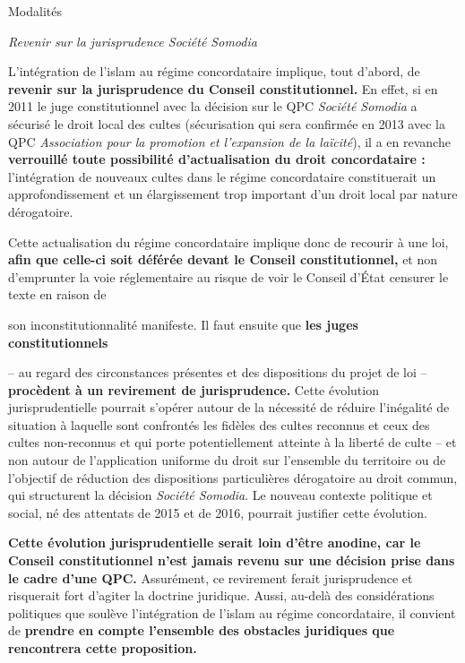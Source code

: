 Modalités


\emph{Revenir sur la jurisprudence Société Somodia}

L'intégration de l'islam au régime concordataire implique, tout d'abord,
de \textbf{revenir sur la jurisprudence du Conseil constitutionnel.} En
effet, si en 2011 le juge constitutionnel avec la décision sur le QPC
\emph{Société Somodia} a sécurisé le droit local des cultes
(sécurisation qui sera confirmée en 2013 avec la QPC \emph{Association
pour la promotion et l'expansion de la laïcité}), il a en revanche
\textbf{verrouillé toute possibilité d'actualisation du droit
concordataire :} l'intégration de nouveaux cultes dans le régime
concordataire constituerait un approfondissement et un élargissement
trop important d'un droit local par nature dérogatoire.

Cette actualisation du régime concordataire implique donc de recourir à
une loi, \textbf{afin que celle-ci soit déférée devant le Conseil
constitutionnel,} et non d'emprunter la voie réglementaire au risque de
voir le Conseil d'État censurer le texte en raison de



son inconstitutionnalité manifeste. Il faut ensuite que \textbf{les
juges constitutionnels}

-- au regard des circonstances présentes et des dispositions du projet
de loi -- \textbf{procèdent à un revirement de jurisprudence.} Cette
évolution jurisprudentielle pourrait s'opérer autour de la nécessité de
réduire l'inégalité de situation à laquelle sont confrontés les fidèles
des cultes reconnus et ceux des cultes non-reconnus et qui porte
potentiellement atteinte à la liberté de culte -- et non autour de
l'application uniforme du droit sur l'ensemble du territoire ou de
l'objectif de réduction des dispositions particulières dérogatoire au
droit commun, qui structurent la décision \emph{Société Somodia}. Le
nouveau contexte politique et social, né des attentats de 2015 et de
2016, pourrait justifier cette évolution.

\textbf{Cette évolution jurisprudentielle serait loin d'être anodine,
car le Conseil constitutionnel n'est jamais revenu sur une décision
prise dans le cadre d'une QPC.} Assurément, ce revirement ferait
jurisprudence et risquerait fort d'agiter la doctrine juridique. Aussi,
au-delà des considérations politiques que soulève l'intégration de
l'islam au régime concordataire, il convient de \textbf{prendre en
compte l'ensemble des obstacles juridiques que rencontrera cette
proposition.}

